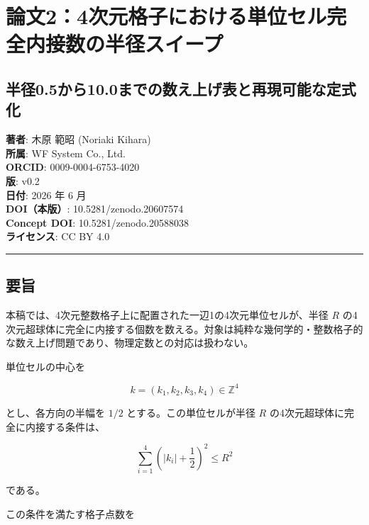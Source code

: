 \documentclass[
]{ltjsarticle}
\author{}
\date{}
\begin{document}
\section{論文2：4次元格子における単位セル完全内接数の半径スイープ}\label{ux8ad6ux658724ux6b21ux5143ux683cux5b50ux306bux304aux3051ux308bux5358ux4f4dux30bbux30ebux5b8cux5168ux5185ux63a5ux6570ux306eux534aux5f84ux30b9ux30a4ux30fcux30d7}

\subsection{半径0.5から10.0までの数え上げ表と再現可能な定式化}\label{ux534aux5f840.5ux304bux308910.0ux307eux3067ux306eux6570ux3048ux4e0aux3052ux8868ux3068ux518dux73feux53efux80fdux306aux5b9aux5f0fux5316}

\textbf{著者}: 木原 範昭 (Noriaki Kihara)\\
\textbf{所属}: WF System Co., Ltd.\\
\textbf{ORCID}: 0009-0004-6753-4020\\
\textbf{版}: v0.2\\
\textbf{日付}: 2026 年 6 月\\
\textbf{DOI（本版）}: 10.5281/zenodo.20607574\\
\textbf{Concept DOI}: 10.5281/zenodo.20588038\\
\textbf{ライセンス}: CC BY 4.0

\begin{center}\rule{0.5\linewidth}{0.5pt}\end{center}

\subsection{要旨}\label{ux8981ux65e8}

本稿では、4次元整数格子上に配置された一辺1の4次元単位セルが、半径 \(R\)
の4次元超球体に完全に内接する個数を数える。対象は純粋な幾何学的・整数格子的な数え上げ問題であり、物理定数との対応は扱わない。

単位セルの中心を

\[
k=(k_1,k_2,k_3,k_4)\in\mathbb{Z}^4
\]

とし、各方向の半幅を \(1/2\) とする。この単位セルが半径 \(R\)
の4次元超球体に完全に内接する条件は、

\[
\sum_{i=1}^{4}
\left(|k_i|+\frac12\right)^2
\le R^2
\]

である。

この条件を満たす格子点数を
\end{document}
